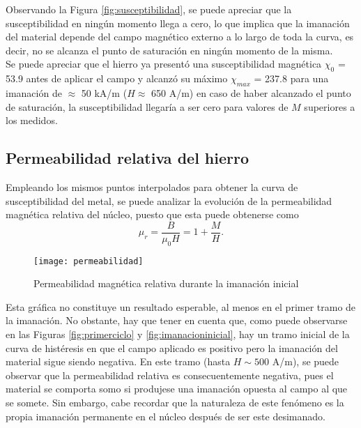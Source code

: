 \documentclass[fleqn,11pt]{SelfArx} %
\begin{document}
Observando la Figura \ref{fig:susceptibilidad}, se puede apreciar que la susceptibilidad en ningún momento llega a cero, lo que implica que la imanación del material depende del campo magnético externo a lo largo de toda la curva, es decir, no se alcanza el punto de saturación en ningún momento de la misma. \\

Se puede apreciar que el hierro ya presentó una susceptibilidad magnética $\chi_0$ = 53.9 antes de aplicar el campo y alcanzó su máximo $\chi_{max}$ = 237.8 para una imanación de $\approx$ 50 kA/m ($H \approx$ 650 A/m) en caso de haber alcanzado el punto de saturación, la susceptibilidad llegaría a ser cero para valores de $M$ superiores a los medidos.

\subsection{Permeabilidad relativa del hierro}
Empleando los mismos puntos interpolados para obtener la curva de susceptibilidad del metal, se puede analizar la evolución de la permeabilidad magnética relativa del núcleo, puesto que esta puede obtenerse como
\begin{equation}\label{permeabilidadrelativa}
	\mu_r = \frac{B}{\mu_0 H} = 1 + \frac{M}{H}.
\end{equation}

\begin{figure}[ht!]\centering
	\texttt{[image: permeabilidad]}
	\caption{Permeabilidad magnética relativa durante la imanación inicial}
	\label{fig:permeabilidad}
\end{figure}
Esta gráfica no constituye un resultado esperable, al menos en el primer tramo de la imanación. No obstante, hay que tener en cuenta que, como puede observarse en las Figuras \ref{fig:primerciclo} y \ref{fig:imanacioninicial}, hay un tramo inicial de la curva de histéresis en que el campo aplicado es positivo pero la imanación del material sigue siendo negativa. En este tramo (hasta $H \sim 500$ A/m), se puede observar que la permeabilidad relativa es consecuentemente negativa, pues el material se comporta somo si produjese una imanación opuesta al campo al que se somete. Sin embargo, cabe recordar que la naturaleza de este fenómeno es la propia imanación permanente en el núcleo después de ser este desimanado. \\

\end{document}
